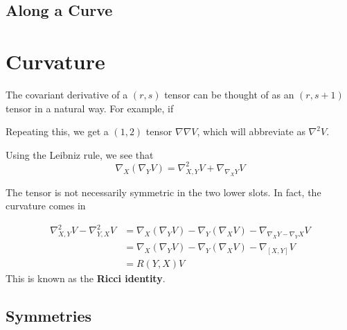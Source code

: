 \subsection{Along a Curve}

\section{Curvature}

The covariant derivative of a $(r,s)$ tensor can be thought of as an $(r,s+1)$ tensor in a natural way.
For example, if 

Repeating this, we get a $(1,2)$ tensor $\nabla\nabla V$, which will abbreviate as $\nabla^2 V$.

Using the Leibniz rule, we see that 
\begin{equation*}
    \nabla_X(\nabla_Y V)=\nabla^2_{X,Y}V+\nabla_{\nabla_X Y}V
\end{equation*}

The tensor is not necessarily symmetric in the two lower slots. In fact, the curvature comes in 

\begin{align*}
    \nabla^2_{X,Y}V-\nabla^2_{Y,X}V&= \nabla_X(\nabla_Y V)-\nabla_Y(\nabla_X V)-\nabla_{\nabla_X Y-\nabla_Y X}V\\
    &=\nabla_X(\nabla_Y V)-\nabla_Y(\nabla_X V)-\nabla_{[X,Y]}V\\
    &=R(Y,X)V
\end{align*}
This is known as the \textbf{Ricci identity}.

\begin{definition}
    
\end{definition}

\subsection{Symmetries}
